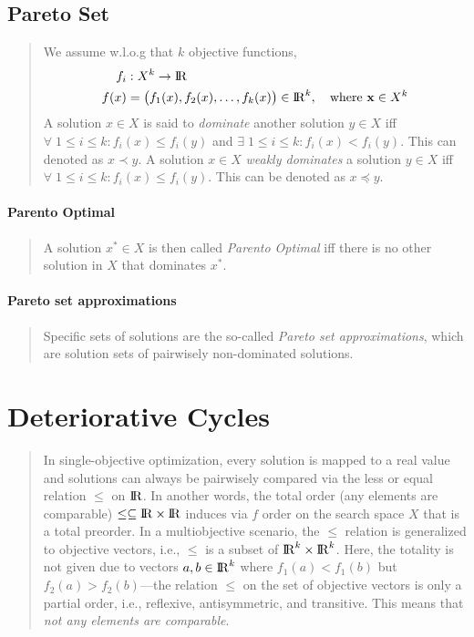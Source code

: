 \documentclass[a4paper, 11pt]{article}
\newcommand{\R}{{\rm I\!R}}
\begin{document}
\subsection{Pareto Set}
    \begin{quote}
        We assume w.l.o.g that $k$ objective functions,
        \begin{equation*}
            \begin{aligned}
                f_i&:X^k\rightarrow\R\\
                f(x) &= \bigl(f_1(x),f_2(x),\ldots,f_k(x)\bigr)\in\R^k,\quad\text{where }\mathbf{x}\in X^k
            \end{aligned} 
        \end{equation*}
        A solution $x\in X$  is said to \emph{dominate} another solution $y\in X$ iff $\forall\;1\leq i\leq k:f_i(x)\leq f_i(y)$ and $\exists\;1\leq i\leq k:f_i(x)<f_i(y)$. This can denoted as
        $x\prec y$. A solution $x\in X$ \emph{weakly dominates} a solution $y\in X$ iff $\forall\;1\leq i\leq k:f_i(x)\leq f_i(y)$. This can be denoted as
        $x\preceq y$.
    \end{quote}
    \paragraph{Parento Optimal}
        \begin{quote}
            A solution $x^*\in X$ is then called \emph{Parento Optimal} iff there is no other solution in $X$ that dominates $x^*$. 
        \end{quote}
    \paragraph{Pareto set approximations}
        \begin{quote}
            Specific sets of solutions are the so-called \emph{Pareto set approximations}, which are solution sets of pairwisely non-dominated solutions.
        \end{quote}
\section{Deteriorative Cycles}  
    \begin{quote}
        In single-objective optimization, every solution is mapped to a real value and solutions can always be pairwisely compared via the less or equal 
        relation $\leq$ on $\R$. In another words, the total order (any elements are comparable) $\leq\subseteq\R\times\R$ induces via $f$ order on the 
        search space $X$ that is a total preorder. In a multiobjective scenario, the $\le$ relation is generalized to objective vectors, i.e., $\le$ is 
        a subset of $\R^k\times\R^k$. Here, the totality is not given due to vectors $a, b \in \R^k$ where $f_1(a) < f_1(b)$ 
        but $f_2(a) > f_2(b)$—the relation $\le$ on the set of objective vectors is only a partial order, i.e., reflexive, antisymmetric, and transitive. 
        This means that \emph{not any elements are comparable}. 
    \end{quote}
\end{document}
